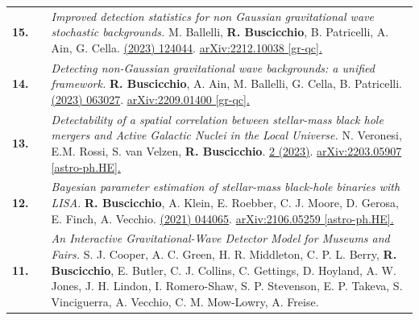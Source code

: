 {\begin{longtable}{rp{0.3cm}p{15.8cm}}
%
\textbf{15.} & & \textit{Improved detection statistics for non Gaussian gravitational wave stochastic backgrounds.}
\newline{}
M. Ballelli, \textbf{R. Buscicchio}, B. Patricelli, A. Ain, G. Cella.
\newline{}
\href{https://journals.aps.org/prd/abstract/10.1103/PhysRevD.107.124044}{\prd 107 (2023) 124044}. \href{https://arxiv.org/abs/2212.10038}{arXiv:2212.10038 [gr-qc].}
\vspace{0.09cm}\\
%
\textbf{14.} & & \textit{Detecting non-Gaussian gravitational wave backgrounds: a unified framework.}
\newline{}
\textbf{R. Buscicchio}, A. Ain, M. Ballelli, G. Cella, B. Patricelli.
\newline{}
\href{https://journals.aps.org/prd/abstract/10.1103/PhysRevD.107.063027}{\prd 107 (2023) 063027}. \href{https://arxiv.org/abs/2209.01400}{arXiv:2209.01400 [gr-qc].}
\vspace{0.09cm}\\
%
\textbf{13.} & & \textit{Detectability of a spatial correlation between stellar-mass black hole mergers and Active Galactic Nuclei in the Local Universe.}
\newline{}
N. Veronesi, E.M. Rossi, S. van Velzen, \textbf{R. Buscicchio}.
\newline{}
\href{https://academic.oup.com/mnras/article/514/2/2092/6587069}{\mnras 514 2 (2023)}. \href{https://arxiv.org/abs/2203.05907}{arXiv:2203.05907 [astro-ph.HE].}
\vspace{0.09cm}\\
%
\textbf{12.} & & \textit{Bayesian parameter estimation of stellar-mass black-hole binaries with LISA.}
\newline{}
\textbf{R. Buscicchio}, A. Klein, E. Roebber, C. J. Moore, D. Gerosa, E. Finch, A. Vecchio.
\newline{}
\href{https://journals.aps.org/prd/abstract/10.1103/PhysRevD.104.044065}{\prd 104 (2021) 044065}. \href{https://arxiv.org/abs/2106.05259}{arXiv:2106.05259 [astro-ph.HE].}
\vspace{0.09cm}\\
%
\textbf{11.} & & \textit{An Interactive Gravitational-Wave Detector Model for Museums and Fairs.}
\newline{}
S. J. Cooper, A. C. Green, H. R. Middleton, C. P. L. Berry, \textbf{R. Buscicchio}, E. Butler, C. J. Collins, C. Gettings, D. Hoyland, A. W. Jones, J. H. Lindon, I. Romero-Shaw, S. P. Stevenson, E. P. Takeva, S. Vinciguerra, A. Vecchio, C. M. Mow-Lowry, A. Freise.

\end{longtable}}
